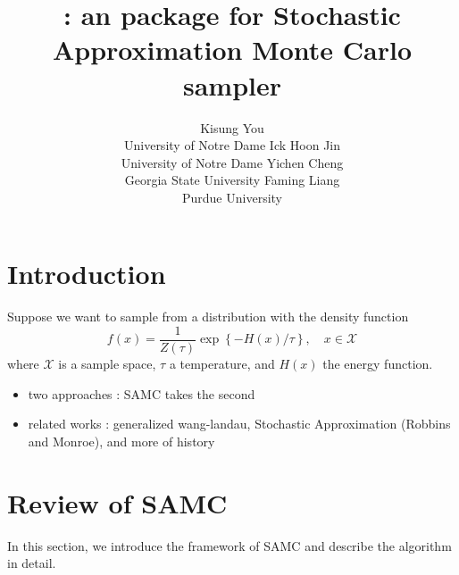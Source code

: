 \documentclass[article]{jss}
\author{Kisung You\\University of Notre Dame
	\And Ick Hoon Jin\\University of Notre Dame
	\And Yichen Cheng\\Georgia State University 
	\AND Faming Liang\\Purdue University}
\title{\pkg{SAMCpack} : an \proglang{R} package for Stochastic Approximation Monte Carlo sampler}
\begin{document}
\section[Introduction]{Introduction}

Suppose we want to sample from a distribution with the density function
%
\begin{equation}
    f(x) = \frac{1}{Z(\tau)} \exp\left\lbrace -H(x)/\tau \right\rbrace,\quad x\in \mathcal{X}
\end{equation}
%
where $\mathcal{X}$ is a sample space, $\tau$ a temperature, and $H(x)$ the energy function. 
\begin{itemize}
    \item two approaches : SAMC takes the second
    \item related works : generalized wang-landau, Stochastic Approximation (Robbins and Monroe), and more of history
\end{itemize}

\section[Review]{Review of SAMC}

In this section, we introduce the framework of SAMC and describe the algorithm in detail.
\end{document}

